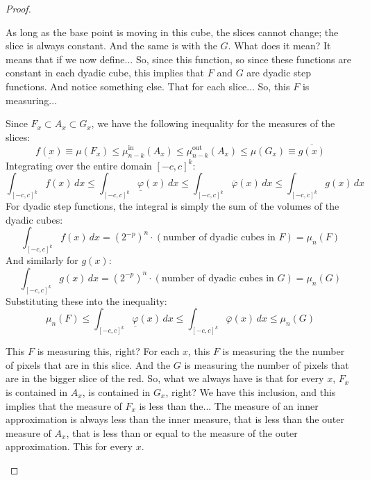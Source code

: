 \begin{proof}
\begin{spoken-clean}[00:09:50 - 00:10:33]
As long as the base point is moving in this cube, the slices cannot change; the slice is always constant. And the same is with the $G$. What does it mean? It means that if we now define... So, since this function, so since these functions are constant in each dyadic cube, this implies that $F$ and $G$ are dyadic step functions. And notice something else. That for each slice... So, this $F$ is measuring...
\end{spoken-clean}

\begin{math-stroke}
Since $F_x \subset A_x \subset G_x$, we have the following inequality for the measures of the slices:
\[
\underline{f(x)} \equiv \mu(F_x) \leq \mu_{n-k}^{\text{in}}(A_x) \leq \mu_{n-k}^{\text{out}}(A_x) \leq \mu(G_x) \equiv \overline{g(x)}
\]
Integrating over the entire domain $[-c,c]^k$:
\[
\int_{[-c,c]^k} f(x) \, dx \leq \int_{[-c,c]^k} \underline{\varphi}(x) \, dx \leq \int_{[-c,c]^k} \overline{\varphi}(x) \, dx \leq \int_{[-c,c]^k} g(x) \, dx
\]
For dyadic step functions, the integral is simply the sum of the volumes of the dyadic cubes:
\[
\int_{[-c,c]^k} f(x) \, dx = (2^{-p})^n \cdot (\text{number of dyadic cubes in } F) = \mu_n(F)
\]
And similarly for $g(x)$:
\[
\int_{[-c,c]^k} g(x) \, dx = (2^{-p})^n \cdot (\text{number of dyadic cubes in } G) = \mu_n(G)
\]
Substituting these into the inequality:
\[
\mu_n(F) \leq \int_{[-c,c]^k} \underline{\varphi}(x) \, dx \leq \int_{[-c,c]^k} \overline{\varphi}(x) \, dx \leq \mu_n(G)
\]
\end{math-stroke}

\begin{spoken-clean}[00:10:52 - 00:11:42]
This $F$ is measuring this, right? For each $x$, this $F$ is measuring the the number of pixels that are in this slice. And the $G$ is measuring the number of pixels that are in the bigger slice of the red. So, what we always have is that for every $x$, $F_x$ is contained in $A_x$, is contained in $G_x$, right? We have this inclusion, and this implies that the measure of $F_x$ is less than the... The measure of an inner approximation is always less than the inner measure, that is less than the outer measure of $A_x$, that is less than or equal to the measure of the outer approximation. This for every $x$.
\end{spoken-clean}


\end{proof}
